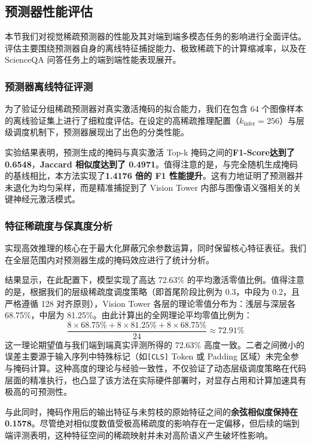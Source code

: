 \documentclass[sigconf]{acmart}
\begin{document}
	\subsection{预测器性能评估}
	
	本节我们对视觉稀疏预测器的性能及其对端到端多模态任务的影响进行全面评估。评估主要围绕预测器自身的离线特征捕捉能力、极致稀疏下的计算缩减率，以及在 ScienceQA 问答任务上的端到端性能表现展开。
	
	\subsubsection{预测器离线特征评测}
	为了验证分组稀疏预测器对真实激活掩码的拟合能力，我们在包含 64 个图像样本的离线验证集上进行了细粒度评估。在设定的高稀疏推理配置（$k_{\mathrm{infer}}=256$）与层级调度机制下，预测器展现出了出色的分类性能。
	
	实验结果表明，预测生成的掩码与真实激活 Top-k 掩码之间的\textbf{F1-Score达到了 0.6548}，\textbf{Jaccard 相似度达到了 0.4971}。值得注意的是，与完全随机生成掩码的基线相比，本方法实现了\textbf{1.4176 倍的 F1 性能提升}。这有力地证明了预测器并未退化为均匀采样，而是精准捕捉到了 Vision Tower 内部与图像语义强相关的关键神经元激活模式。
	
	\subsubsection{特征稀疏度与保真度分析 }
	实现高效推理的核心在于最大化屏蔽冗余参数运算，同时保留核心特征表征。我们在全层范围内对预测器生成的掩码效应进行了统计分析。
	
	结果显示，在此配置下，模型实现了高达 72.63\% 的平均激活零值比例。值得注意的是，根据我们的层级稀疏度调度策略（即首尾阶段比例为 0.3，中段为 0.2，且严格遵循 128 对齐原则），Vision Tower 各层的理论零值分布为：浅层与深层各 68.75\%，中层为 81.25\%。由此计算出的全网理论平均零值比例为：
	\begin{equation}
		\frac{8 \times 68.75\% + 8 \times 81.25\% + 8 \times 68.75\%}{24} \approx 72.91\%
	\end{equation}
	这一理论期望值与我们端到端真实评测所得的 72.63\% 高度一致。二者之间微小的误差主要源于输入序列中特殊标记（如\texttt{[CLS]} Token 或 Padding 区域）未完全参与掩码计算。这种高度的理论与经验一致性，不仅验证了动态层级调度策略在代码层面的精准执行，也凸显了该方法在实际硬件部署时，对显存占用和计算加速具有极高的可预测性。
	
	与此同时，掩码作用后的输出特征与未剪枝的原始特征之间的\textbf{余弦相似度保持在 0.1578}。尽管绝对相似度数值受极高稀疏度的影响存在一定偏移，但后续的端到端评测表明，这种特征空间的稀疏映射并未对高阶语义产生破坏性影响。
	
\end{document}
